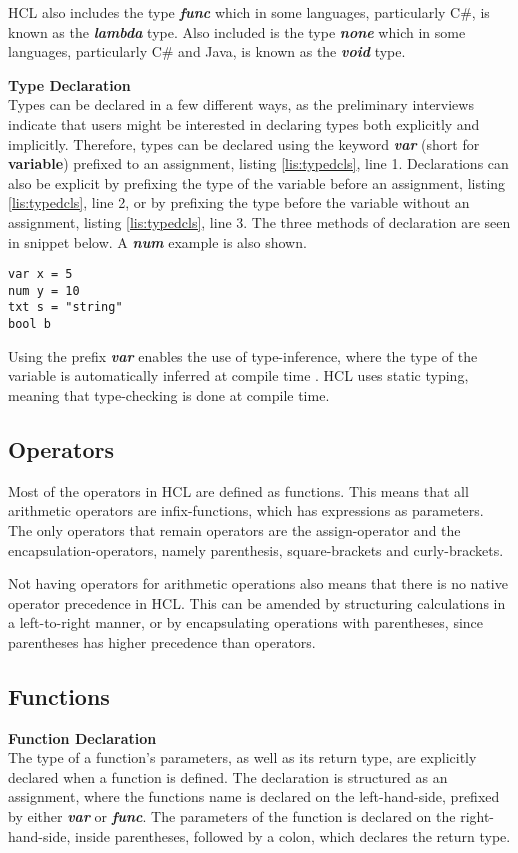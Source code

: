 HCL also includes the type \textbf{\textit{func}} which in some languages, particularly C\#, is known as the \textbf{\textit{lambda}} type.
Also included is the type \textbf{\textit{none}} which in some languages, particularly C\# and Java, is known as the \textbf{\textit{void}} type. 

\textbf{Type Declaration}\\
Types can be declared in a few different ways, as the preliminary interviews indicate that users might be interested in declaring types both explicitly and implicitly.
Therefore, types can be declared using the keyword \textbf{\textit{var}} (short for \textbf{variable\textit{}}) prefixed to an assignment, listing \ref{lis:typedcls}, line 1.
Declarations can also be explicit by prefixing the type of the variable before an assignment, listing \ref{lis:typedcls}, line 2, or by prefixing the type before the variable without an assignment, listing \ref{lis:typedcls}, line 3.
The three methods of declaration are seen in snippet below.
A  \textbf{\textit{num}} example is also shown.

\begin{lstlisting}[language=HCL,label=lis:typedcls,firstnumber=1]
var x = 5
num y = 10
txt s = "string"
bool b
\end{lstlisting}

Using the prefix \textbf{\textit{var}} enables the use of type-inference, where the type of the variable is automatically inferred at compile time \cite{typeinf}.
HCL uses static typing, meaning that type-checking is done at compile time.

\subsection{Operators}
Most of the operators in HCL are defined as functions.
This means that all arithmetic operators are infix-functions, which has expressions as parameters. 
The only operators that remain operators are the assign-operator and the encapsulation-operators, namely parenthesis, square-brackets and curly-brackets.

Not having operators for arithmetic operations also means that there is no native operator precedence in HCL.
This can be amended by structuring calculations in a left-to-right manner, or by encapsulating operations with parentheses, since parentheses has higher precedence than operators.

\subsection{Functions}
\textbf{Function Declaration}\\
The type of a function's parameters, as well as its return type, are explicitly declared when a function is defined. 
The declaration is structured as an assignment, where the functions name is declared on the left-hand-side, prefixed by either \textbf{\textit{var}} or \textbf{\textit{func}}. 
The parameters of the function is declared on the right-hand-side, inside parentheses, followed by a colon, which declares the return type. 


